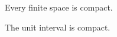 \documentclass{catjournal}
\begin{document}
\begin{remark} Every finite space is compact. \end{remark}
\begin{eg} The unit interval is compact. \end{eg}
\end{document}
